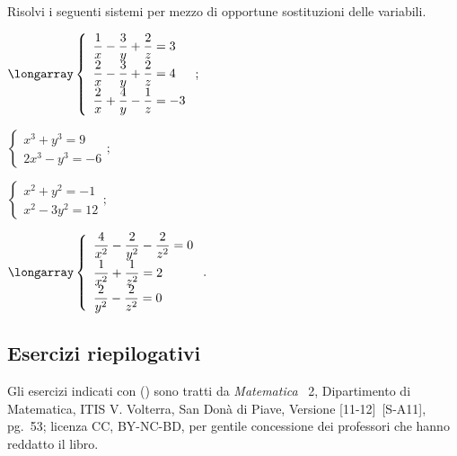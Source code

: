 \begin{esercizio}[\Ast]
 \label{ese:22.66}
 Risolvi i seguenti sistemi per mezzo di opportune sostituzioni delle variabili.
\begin{multicols}{2}
\begin{enumeratea}
\item $\longarray\left\{\begin{array}{l}\dfrac{1}{x}-\dfrac{3}{y}+\dfrac{2}{z}=3 \\\dfrac{2}{x}-\dfrac{3}{y}+\dfrac{2}{z}=4
\\\dfrac{2}{x}+\dfrac{4}{y}-\dfrac{1}{z}=-3\end{array}\right.;$
\item $\left\{\begin{array}{l}x^{3}+y^{3}=9 \\2x^{3}-y^{3}=-6 \end{array}\right.;$
\item $\left\{\begin{array}{l}x^{2}+y^{2}=-1\\x^{2}-3y^{2}=12\end{array}\right.;$
\item $\longarray\left\{\begin{array}{l}\dfrac{4}{x^{2}}-\dfrac{2}{y^{2}}-\dfrac{2}{z^{2}}=0\\\dfrac{1}{x^{2}}+\dfrac{1}{z^{2}}=2
\\\dfrac{2}{y^{2}}-\dfrac{2}{z^{2}}=0\end{array}\right..$
\end{enumeratea}
\end{multicols}
\end{esercizio}

\subsection{Esercizi riepilogativi}
Gli esercizi indicati con (\croce) sono tratti da \emph{Matematica }~2, Dipartimento di
Matematica, ITIS V. Volterra, San Donà di Piave, Versione [11-12]~[S-A11], pg.~53; licenza CC, BY-NC-BD, per gentile concessione dei
professori che hanno reddatto il libro.%


